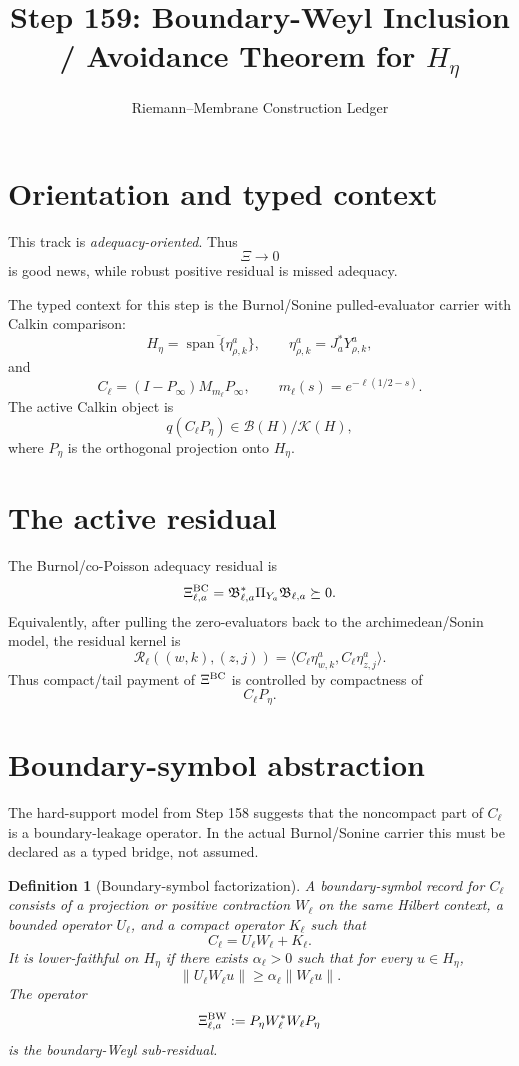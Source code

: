 \documentclass[11pt]{article}
\title{Step 159: Boundary-Weyl Inclusion / Avoidance Theorem for $H_\eta$}
\author{Riemann--Membrane Construction Ledger}
\date{}
\newtheorem{definition}{Definition}
\begin{document}
\maketitle

\section*{Orientation and typed context}
This track is \emph{adequacy-oriented}.  Thus
\[
  \Xi\to 0
\]
is good news, while robust positive residual is missed adequacy.

The typed context for this step is the Burnol/Sonine pulled-evaluator carrier with Calkin comparison:
\[
  H_\eta
  =\overline{\operatorname{span}\{\eta^a_{\rho,k}\}},
  \qquad
  \eta^a_{\rho,k}=J_a^*Y^a_{\rho,k},
\]
and
\[
  C_\ell=(I-P_\infty)M_{m_\ell}P_\infty,
  \qquad
  m_\ell(s)=e^{-\ell(1/2-s)}.
\]
The active Calkin object is
\[
  q(C_\ell P_\eta)\in \mathcal B(H)/\mathcal K(H),
\]
where $P_\eta$ is the orthogonal projection onto $H_\eta$.

\section{The active residual}
The Burnol/co-Poisson adequacy residual is
\[
  \Xi^{\rm BC}_{\ell,a}
  =\mathfrak B_{\ell,a}^*\Pi_{Y_a}\mathfrak B_{\ell,a}
  \succeq 0.
\]
Equivalently, after pulling the zero-evaluators back to the archimedean/Sonin model, the residual kernel is
\[
  \mathcal R_\ell((w,k),(z,j))
  =\langle C_\ell\eta^a_{w,k},C_\ell\eta^a_{z,j}\rangle.
\]
Thus compact/tail payment of $\Xi^{\rm BC}$ is controlled by compactness of
\[
  C_\ell P_\eta.
\]

\section{Boundary-symbol abstraction}
The hard-support model from Step 158 suggests that the noncompact part of $C_\ell$ is a boundary-leakage operator.  In the actual Burnol/Sonine carrier this must be declared as a typed bridge, not assumed.

\begin{definition}[Boundary-symbol factorization]
A boundary-symbol record for $C_\ell$ consists of a projection or positive contraction $W_\ell$ on the same Hilbert context, a bounded operator $U_\ell$, and a compact operator $K_\ell$ such that
\[
  C_\ell = U_\ell W_\ell + K_\ell.
\]
It is \emph{lower-faithful on $H_\eta$} if there exists $\alpha_\ell>0$ such that for every $u\in H_\eta$,
\[
  \|U_\ell W_\ell u\|
  \ge \alpha_\ell\|W_\ell u\|.
\]
The operator
\[
  \Xi^{\rm BW}_{\ell,a}:=P_\eta W_\ell^*W_\ell P_\eta
\]
is the boundary-Weyl sub-residual.
\end{definition}
\end{document}
